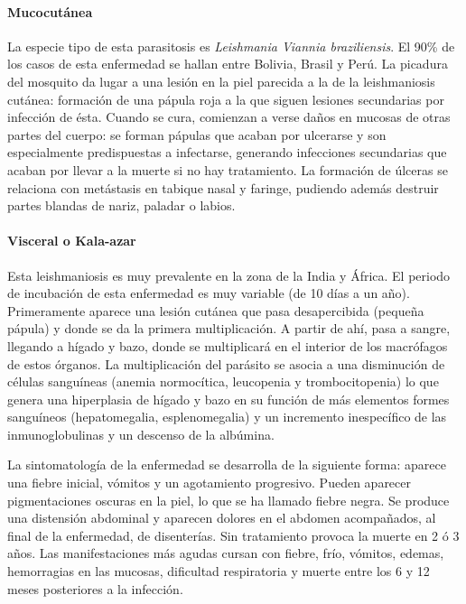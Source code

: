\paragraph{Mucocutánea}
La especie tipo de esta parasitosis es \textit{Leishmania Viannia braziliensis}. El 90\% de los casos de esta enfermedad se hallan entre Bolivia, Brasil y Perú. La picadura del mosquito da lugar a una lesión en la piel parecida a la de la leishmaniosis cutánea: formación de una pápula roja a la que siguen lesiones secundarias por infección de ésta. Cuando se cura, comienzan a verse daños en mucosas de otras partes del cuerpo: se forman pápulas que acaban por ulcerarse y son especialmente predispuestas a infectarse, generando infecciones secundarias que acaban por llevar a la muerte si no hay tratamiento. La formación de úlceras se relaciona con metástasis en tabique nasal y faringe, pudiendo además destruir partes blandas de nariz, paladar o labios.
\paragraph{Visceral o Kala-azar}
Esta leishmaniosis es muy prevalente en la zona de la India y África. El periodo de incubación de esta enfermedad es muy variable (de 10 días a un año). Primeramente aparece una lesión cutánea que pasa desapercibida (pequeña pápula) y donde se da la primera multiplicación. A partir de ahí, pasa a sangre, llegando a hígado y bazo, donde se multiplicará en el interior de los macrófagos de estos órganos.
La multiplicación del parásito se asocia a una disminución de células sanguíneas (anemia normocítica, leucopenia y trombocitopenia) lo que genera una hiperplasia de hígado y bazo en su función de más elementos formes sanguíneos (hepatomegalia, esplenomegalia) y un incremento inespecífico de las inmunoglobulinas y un descenso de la albúmina.

La sintomatología de la enfermedad se desarrolla de la siguiente forma: aparece una fiebre inicial, vómitos y un agotamiento progresivo. Pueden aparecer pigmentaciones oscuras en la piel, lo que se ha llamado fiebre negra. Se produce una distensión abdominal y aparecen dolores en el abdomen acompañados, al final de la enfermedad, de disenterías. Sin tratamiento provoca la muerte en 2 ó 3 años. Las manifestaciones más agudas cursan con fiebre, frío, vómitos, edemas, hemorragias en las mucosas, dificultad respiratoria y muerte entre los 6 y 12 meses posteriores a la infección. 
